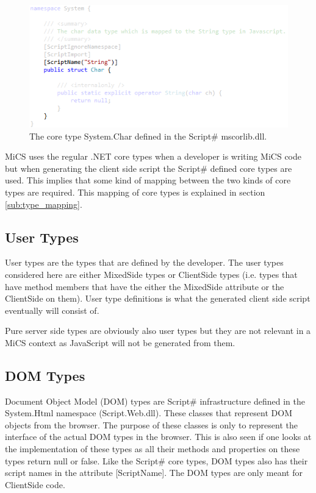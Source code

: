 	\begin{figure}[H]
			\includegraphics[width=13cm]{resources/images/Char.png}
		\caption{The core type System.Char defined in the Script\# mscorlib.dll.}
		\label{char}
	\end{figure}

		MiCS uses the regular .NET core types when a developer is writing MiCS code but when generating the client side script the Script\# defined core types are used. This implies that some kind of mapping between the two kinds of core types are required. This mapping of core types is explained in section \ref{sub:type_mapping}.

	\subsection{User Types} %
	\label{sub:user_types}
		User types are the types that are defined by the developer. The user types considered here are either MixedSide types or ClientSide types (i.e. types that have method members that have the either the MixedSide attribute or the ClientSide on them). User type definitions is what the generated client side script eventually will consist of. 

		Pure server side types are obviously also user types but they are not relevant in a MiCS context as JavaScript will not be generated from them.

	\subsection{DOM Types} %
	\label{sub:dom_types}
		Document Object Model (DOM) types are Script\# infrastructure defined in the System.Html namespace (Script.Web.dll). These classes that represent DOM objects from the browser. The purpose of these classes is only to represent the interface of the actual DOM types in the browser. This is also seen if one looks at the implementation of these types as all their methods and properties on these types return null or false. Like the Script\# core types, DOM types also has their script names in the attribute [ScriptName]. The DOM types are only meant for ClientSide code.

